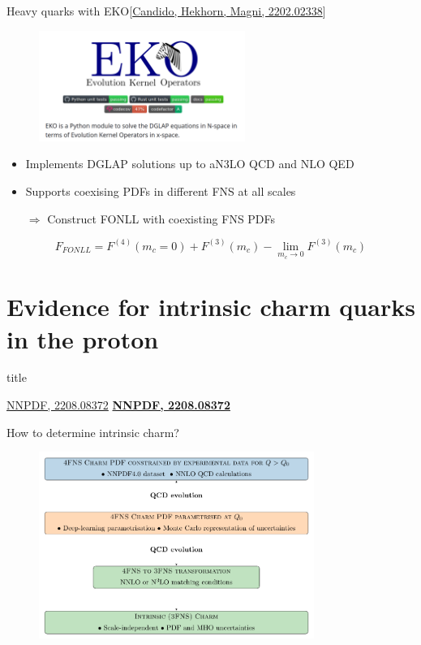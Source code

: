 \documentclass[aspectratio=43, 8pt,t]{beamer}
\newcommand{\SectionTitleFrame}[1][]{%
  \begin{frame}
    \vfill
    \centering
    \begin{beamercolorbox}[sep=8pt,center,shadow=true,rounded=true]{title}
      \usebeamerfont{title}\insertsection\par
    \end{beamercolorbox}
    \ifx\relax#1\relax\else
      \vspace{0.5cm}
      \textbf{#1}
    \fi
    \vfill
  \end{frame}
}
\begin{document}
\begin{frame}{Heavy quarks with EKO}{\color{gray}\footnotesize [\hyperlink{https://arxiv.org/abs/2202.02338}{Candido, Hekhorn, Magni, 2202.02338}]}
  \begin{figure}
    \includegraphics[width=0.6\textwidth]{eko_header.png}
  \end{figure}
  \begin{itemize}
    \item Implements DGLAP solutions up to aN3LO QCD and NLO QED
    \item Supports coexising PDFs in different FNS at all scales
    \item[$\Rightarrow$] Construct FONLL with coexisting FNS PDFs
  \end{itemize}

  $$F_{FONLL} = F^{(4)}(m_c=0) + F^{(3)}(m_c) - \lim_{m_c\rightarrow 0} F^{(3)}(m_c)$$
\end{frame}


\section*{Evidence for intrinsic charm quarks in the proton}
\SectionTitleFrame[\hyperlink{https://arxiv.org/abs/2208.08372}{NNPDF, 2208.08372}]

\begin{frame}{How to determine intrinsic charm?}
  \begin{figure}
    \includegraphics[width=0.8\textwidth]{strategy.pdf}
  \end{figure}

\end{frame}
\end{document}
